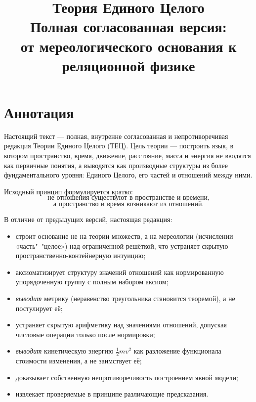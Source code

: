 \documentclass[12pt,a4paper,oneside]{book}
\title{\Huge\textbf{Теория Единого Целого}\\[0.8em]
\Large Полная согласованная версия:\\
от мереологического основания к реляционной физике}
\author{}
\date{}
\theoremstyle{definition}
\theoremstyle{plain}
\theoremstyle{remark}
\begin{document}
\frontmatter
\maketitle

\chapter*{Аннотация}

Настоящий текст --- полная, внутренне согласованная и непротиворечивая редакция
Теории Единого Целого (ТЕЦ). Цель теории --- построить язык, в котором
пространство, время, движение, расстояние, масса и энергия не вводятся как
первичные понятия, а выводятся как производные структуры из более
фундаментального уровня: Единого Целого, его частей и отношений между ними.

Исходный принцип формулируется кратко:
\[
\boxed{\text{не отношения существуют в пространстве и времени,}}
\]
\[
\boxed{\text{а пространство и время возникают из отношений.}}
\]

В отличие от предыдущих версий, настоящая редакция:

\begin{itemize}
    \item строит основание не на теории множеств, а на мереологии (исчислении
    «часть"--"целое») над ограниченной решёткой, что устраняет скрытую
    пространственно-контейнерную интуицию;
    \item аксиоматизирует структуру значений отношений как нормированную
    упорядоченную группу с полным набором аксиом;
    \item \emph{выводит} метрику (неравенство треугольника становится теоремой),
    а не постулирует её;
    \item устраняет скрытую арифметику над значениями отношений, допуская числовые
    операции только после нормировки;
    \item \emph{выводит} кинетическую энергию $\tfrac12 m v^2$ как разложение
    функционала стоимости изменения, а не заимствует её;
    \item доказывает собственную непротиворечивость построением явной модели;
    \item извлекает проверяемые в принципе различающие предсказания.
\end{itemize}

\tableofcontents

\mainmatter
\setcounter{chapter}{-1}
\end{document}
